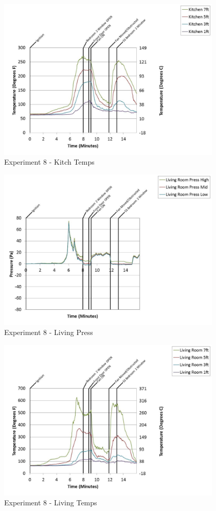 \documentclass{article}
\begin{document}
\begin{appendices}
	\clearpage

	\begin{figure}[h!]
		\centering
		\includegraphics[height=3.05in]{0_Images/Results_Charts/Exp_8_Charts/KitchTemps.pdf}
		\caption{Experiment 8 - Kitch Temps}
	\end{figure}
 

	\begin{figure}[h!]
		\centering
		\includegraphics[height=3.05in]{0_Images/Results_Charts/Exp_8_Charts/LivingPress.pdf}
		\caption{Experiment 8 - Living Press}
	\end{figure}
 
	\clearpage

	\begin{figure}[h!]
		\centering
		\includegraphics[height=3.05in]{0_Images/Results_Charts/Exp_8_Charts/LivingTemps.pdf}
		\caption{Experiment 8 - Living Temps}
	\end{figure}
 


\end{appendices}
\end{document}
